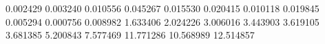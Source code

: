 0.002429
0.003240
0.010556
0.045267
0.015530
0.020415
0.010118
0.019845
0.005294
0.000756
0.008982
1.633406
2.024226
3.006016
3.443903
3.619105
3.681385
5.200843
7.577469
11.771286
10.568989
12.514857
